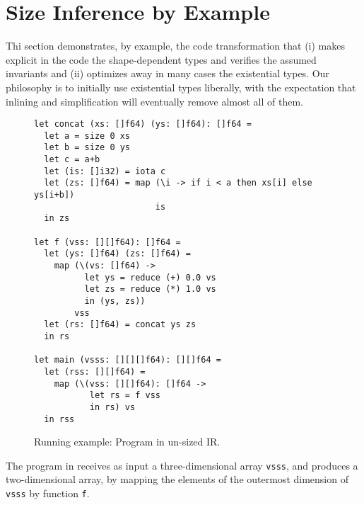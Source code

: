 \section{Size Inference by Example}
\label{subsec:size-analysis-intuition}

Thi section demonstrates, by example, the code transformation that (i)
makes explicit in the code the shape-dependent types and verifies the
assumed invariants and (ii) optimizes away in many cases the
existential types.  Our philosophy is to initially use existential
types liberally, with the expectation that inlining and simplification
will eventually remove almost all of them.

\begin{figure}
\begin{lstlisting}
let concat (xs: []f64) (ys: []f64): []f64 =
  let a = size 0 xs
  let b = size 0 ys
  let c = a+b
  let (is: []i32) = iota c
  let (zs: []f64) = map (\i -> if i < a then xs[i] else ys[i+b])
                        is
  in zs

let f (vss: [][]f64): []f64 =
  let (ys: []f64) (zs: []f64) =
    map (\(vs: []f64) ->
          let ys = reduce (+) 0.0 vs
          let zs = reduce (*) 1.0 vs
          in (ys, zs))
        vss
  let (rs: []f64) = concat ys zs
  in rs

let main (vsss: [][][]f64): [][]f64 =
  let (rss: [][]f64) =
    map (\(vss: [][]f64): []f64 ->
           let rs = f vss
           in rs) vs
  in rss
\end{lstlisting}

\caption{Running example: Program in un-sized IR.} 
\label{fig:RunEgSrc}
\end{figure}

The program in  receives as input a
three-dimensional array \texttt{vsss}, and produces a two-dimensional
array, by mapping the elements of the outermost dimension of
\texttt{vsss} by function \texttt{f}.


